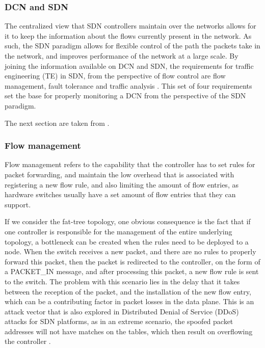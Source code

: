 \subsubsection {DCN and SDN}

\par The centralized view that SDN controllers maintain over the networks allows for it to keep the information about the flows currently present in the network. As
such, the SDN paradigm allows for flexible control of the path the packets take in the network, and improves performance of the network at a large
scale. By joining the information available on DCN and SDN, the requirements for traffic engineering (TE) in SDN, from the perspective of flow control are flow 
management, fault tolerance and traffic analysis \cite{akyildiz_research_2016}. This set of four requirements set the base for properly monitoring a DCN from the 
perspective of the SDN paradigm.
\par The next section are taken from \cite{akyildiz_research_2016}.

\subsubsection {Flow management}

Flow management refers to the capability that the controller has to set rules for packet forwarding, and maintain the low overhead that is associated with
registering a new flow rule, and also limiting the amount of flow entries, as hardware switches usually have a set amount of flow entries that they can support.

\par If we consider the fat-tree topology, one obvious consequence is the fact that if one controller is responsible for the management of the entire underlying 
topology, a bottleneck can be created when the rules need to be deployed to a node. When the switch receives a new packet, and there 
are no rules to properly forward this packet, then the packet is redirected to the controller, on the form of a \textsc{PACKET\_IN} message, and after processing
this packet, a new flow rule is sent to the switch. The problem with this scenario lies in the delay that it takes between the reception of the packet, and the
installation of the new flow entry, which can be a contributing factor in packet losses in the data plane. This is an attack vector that is also explored in
Distributed Denial of Service (DDoS) attacks for SDN platforms, as in an extreme scenario, the spoofed packet addresses will not have matches on the tables, which
then result on overflowing the controller \cite{mousavi_early_2015}.

